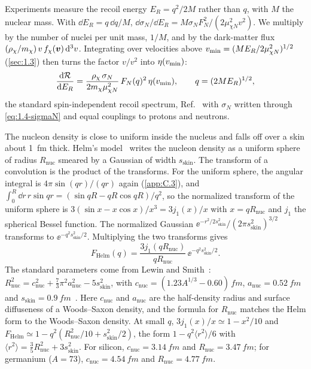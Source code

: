 Experiments measure the recoil energy $E_R = q^2/2M$ rather than $q$, with $M$ the nuclear mass. With $\dd E_R = q\,\dd q/M$, $\dd\sigma_N/\dd E_R = M\sigma_NF_N^2/(2\mu_{\chi N}^2v^2)$. We multiply by the number of nuclei per unit mass, $1/M$, and by the dark-matter flux $(\rho_\chi/m_\chi)\,v\,f_\chi(\bm{v})\,\mathrm{d}^3v$. Integrating over velocities above $v_{\mathrm{min}} = (ME_R/2\mu_{\chi N}^2)^{1/2}$ (\cref{sec:1.3}) then turns the factor $v/v^2$ into $\eta(v_{\mathrm{min}})$:
\begin{equation*}
  \frac{\mathrm{d}\mathcal{R}}{\mathrm{d} E_R} = \frac{\rho_\chi\,\sigma_N}{2m_\chi\mu_{\chi N}^2}\,F_N(q)^2\,\eta(v_{\mathrm{min}}) , \qquad q = (2ME_R)^{1/2} ,
\end{equation*}
the standard spin-independent recoil spectrum, Ref.~\cite[Eq.~(104)]{lin2019tasi} with $\sigma_N$ written through \cref{eq:1.4-sigmaN} and equal couplings to protons and neutrons.

The nucleon density is close to uniform inside the nucleus and falls off over a skin about \SI{1}{fm} thick. Helm's model~\cite{helm1956inelastic} writes the nucleon density as a uniform sphere of radius $R_{\mathrm{nuc}}$ smeared by a Gaussian of width $s_{\mathrm{skin}}$. The transform of a convolution is the product of the transforms. For the uniform sphere, the angular integral is $4\pi\sin(qr)/(qr)$ again (\cref{app:C.3}), and $\int_0^{R}\dd r\,r\sin qr = (\sin qR - qR\cos qR)/q^2$, so the normalized transform of the uniform sphere is $3(\sin x - x\cos x)/x^3 = 3j_1(x)/x$ with $x = qR_{\mathrm{nuc}}$ and $j_1$ the spherical Bessel function. The normalized Gaussian $\ee^{-r^2/2s_{\mathrm{skin}}^2}/(2\pi s_{\mathrm{skin}}^2)^{3/2}$ transforms to $\ee^{-q^2s_{\mathrm{skin}}^2/2}$. Multiplying the two transforms gives~\cite[Eq.~(17)]{duda2007model}
\begin{equation}
  F_{\mathrm{Helm}}(q) = \frac{3j_1(qR_{\mathrm{nuc}})}{qR_{\mathrm{nuc}}}\,\ee^{-q^2s_{\mathrm{skin}}^2/2} .
  \label{eq:2.2-helm}
\end{equation}
The standard parameters come from Lewin and Smith~\cite{lewin1996review}: $R_{\mathrm{nuc}}^2 = c_{\mathrm{nuc}}^2 + \tfrac73\pi^2a_{\mathrm{nuc}}^2 - 5s_{\mathrm{skin}}^2$, with $c_{\mathrm{nuc}} = (1.23A^{1/3} - 0.60)\,\si{fm}$, $a_{\mathrm{nuc}} = \SI{0.52}{fm}$ and $s_{\mathrm{skin}} = \SI{0.9}{fm}$~\cite[Eqs.~(11) and (12), quoting Lewin and Smith]{duda2007model}. Here $c_{\mathrm{nuc}}$ and $a_{\mathrm{nuc}}$ are the half-density radius and surface diffuseness of a Woods--Saxon density, and the formula for $R_{\mathrm{nuc}}$ matches the Helm form to the Woods--Saxon density. At small $q$, $3j_1(x)/x \simeq 1 - x^2/10$ and $F_{\mathrm{Helm}} \simeq 1 - q^2(R_{\mathrm{nuc}}^2/10 + s_{\mathrm{skin}}^2/2)$, the form $1 - q^2\langle r^2\rangle/6$ with $\langle r^2\rangle = \tfrac35R_{\mathrm{nuc}}^2 + 3s_{\mathrm{skin}}^2$. For silicon, $c_{\mathrm{nuc}} = \SI{3.14}{fm}$ and $R_{\mathrm{nuc}} = \SI{3.47}{fm}$; for germanium ($A = 73$), $c_{\mathrm{nuc}} = \SI{4.54}{fm}$ and $R_{\mathrm{nuc}} = \SI{4.77}{fm}$.

